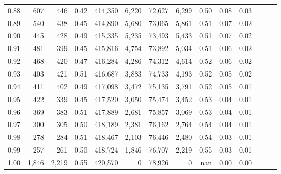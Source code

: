 \begin{tabular}{rrrrrrrrrrrrrr}
0.88 &     607 &    446 &  0.42 &  414,350 &    6,220 &  72,627 &   6,299 &  0.50 &  0.08 &      0.03 \\
0.89 &     540 &    438 &  0.45 &  414,890 &    5,680 &  73,065 &   5,861 &  0.51 &  0.07 &      0.02 \\
0.90 &     445 &    428 &  0.49 &  415,335 &    5,235 &  73,493 &   5,433 &  0.51 &  0.07 &      0.02 \\
0.91 &     481 &    399 &  0.45 &  415,816 &    4,754 &  73,892 &   5,034 &  0.51 &  0.06 &      0.02 \\
0.92 &     468 &    420 &  0.47 &  416,284 &    4,286 &  74,312 &   4,614 &  0.52 &  0.06 &      0.02 \\
0.93 &     403 &    421 &  0.51 &  416,687 &    3,883 &  74,733 &   4,193 &  0.52 &  0.05 &      0.02 \\
0.94 &     411 &    402 &  0.49 &  417,098 &    3,472 &  75,135 &   3,791 &  0.52 &  0.05 &      0.01 \\
0.95 &     422 &    339 &  0.45 &  417,520 &    3,050 &  75,474 &   3,452 &  0.53 &  0.04 &      0.01 \\
0.96 &     369 &    383 &  0.51 &  417,889 &    2,681 &  75,857 &   3,069 &  0.53 &  0.04 &      0.01 \\
0.97 &     300 &    305 &  0.50 &  418,189 &    2,381 &  76,162 &   2,764 &  0.54 &  0.04 &      0.01 \\
0.98 &     278 &    284 &  0.51 &  418,467 &    2,103 &  76,446 &   2,480 &  0.54 &  0.03 &      0.01 \\
0.99 &     257 &    261 &  0.50 &  418,724 &    1,846 &  76,707 &   2,219 &  0.55 &  0.03 &      0.01 \\
1.00 &   1,846 &  2,219 &  0.55 &  420,570 &        0 &  78,926 &       0 &   nan &  0.00 &      0.00 \\
\bottomrule
\end{tabular}
